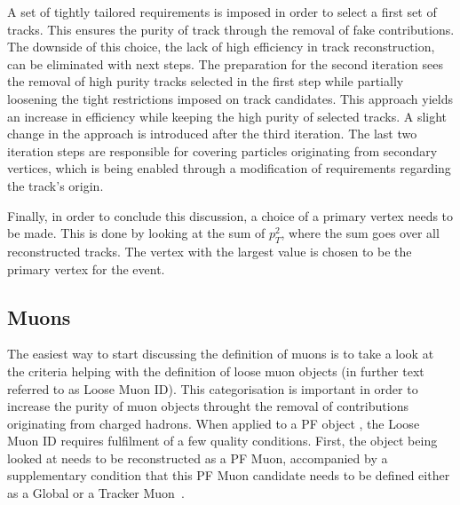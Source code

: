 \hspace{10pt} A set of tightly tailored requirements is imposed in order to select a first set of tracks. This ensures the purity of track through the removal of fake contributions. The downside of this choice, the lack of high efficiency in track reconstruction, can be eliminated with next steps. The preparation for the second iteration sees the removal of high purity tracks selected in the first step while partially loosening the tight restrictions imposed on track candidates. This approach yields an increase in efficiency while keeping the high purity of selected tracks. A slight change in the approach is introduced after the third iteration. The last two iteration steps are responsible for covering particles originating from secondary vertices, which is being enabled through a modification of requirements regarding the track's origin.

\hspace{10pt} Finally, in order to conclude this discussion, a choice of a primary vertex needs to be made. This is done by looking at the sum of $p_T^2$, where the sum goes over all reconstructed tracks. The vertex with the largest value is chosen to be the primary vertex for the event.

\subsection{Muons}
\label{subsec:muons}

\hspace{10pt} The easiest way to start discussing the definition of muons is to take a look at the criteria helping with the definition of loose muon objects (in further text referred to as Loose Muon ID). This categorisation is important in order to increase the purity of muon objects throught the removal of contributions originating from charged hadrons. When applied to a PF object%
, the Loose Muon ID requires fulfilment of a few quality conditions. First, the object being looked at needs to be reconstructed as a PF Muon, accompanied by a supplementary condition that this PF Muon candidate needs to be defined either as a Global or a Tracker Muon~\cite{paper:pf_muon_1,paper:pf_muon_2}. 

